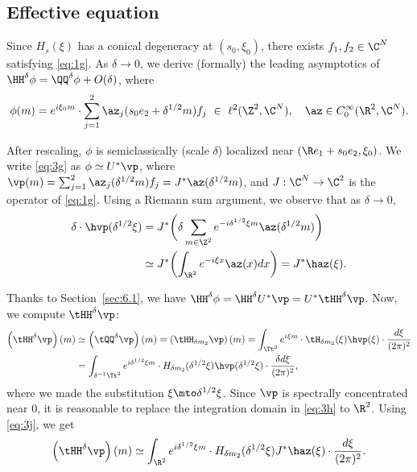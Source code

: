 \subsection{Effective equation} Since $H_s(\xi)$ has a conical degeneracy at $(s_0,\xi_0)$, there exists $f_1, f_2 \in \C^N$ satisfying \eqref{eq:1g}. As $\delta \to 0$, we derive (formally) the leading asymptotics of $\HH^\delta \phi = \QQ^\delta \phi + O(\delta)$, where
\begin{equation}\label{eq:3g}
\phi(m) = e^{i\xi_0 m} \cdot \sum_{j=1}^2 \az_j(s_0 e_2+\delta^{1/2} m) f_j \ \in \ \ell^2(\Z^2,\C^N), \quad \az \in C_0^\infty(\R^2,\C^N).
\end{equation}

After rescaling, $\phi$ is semiclassically (scale $\delta$) localized near $(\R e_1 + s_0e_2,\xi_0)$.
We write \eqref{eq:3g} as $\phi \simeq U^* \vp$, where $\vp(m) = \sum_{j=1}^2 \az_j(\delta^{1/2} m) f_j = J^* \az(\delta^{1/2} m)$,
and $J : \C^N \to \C^2$ is the operator of \eqref{eq:1g}. Using a Riemann sum argument, we observe that as $\delta \to 0$,
\begin{equation}\label{eq:3j}
\begin{split}
\delta \cdot \hvp(\delta^{1/2} \xi) &= J^* \biggl( \delta \sum_{m \in \Z^2} e^{-i \delta^{1/2} \xi m} \az(\delta^{1/2} m) \biggr)\\
&\simeq J^* \biggl( \int_{\R^2} e^{-i \xi x} \az(x) dx\biggr) = J^* \haz(\xi).
\end{split}
\end{equation}

Thanks to Section~\ref{sec:6.1}, we have $\HH^\delta \phi = \HH^\delta U^* \vp = U^* \tHH^\delta \vp$. Now, we compute $\tHH^\delta \vp$:
\begin{equation}\label{eq:3h}
\begin{split}
\left(\tHH^\delta \vp \right)(m) &\simeq \left(\tQQ^\delta \vp\right)(m) = \left(\tHH_{\delta m_2} \vp\right)(m) = \int_{\Tt^2} e^{i\xi m} \cdot \tH_{\delta m_2}(\xi) \hvp(\xi) \cdot \dfrac{d\xi}{(2\pi)^2}
\\
&= \int_{\delta^{-1} \Tt^2} e^{i\delta^{1/2} \xi m} \cdot H_{\delta m_2}(\delta^{1/2} \xi) \hvp(\delta^{1/2} \xi) \cdot \dfrac{\delta d\xi}{(2\pi)^2},
\end{split}
\end{equation}
where we made the substitution $\xi \mto \delta^{1/2} \xi$. Since $\vp$ is spectrally concentrated near $0$, it is reasonable to replace the integration domain in \eqref{eq:3h} to $\R^2$. Using \eqref{eq:3j}, we get
\begin{equation}\label{eq:3m}
\left(\tHH^\delta \vp \right)(m) \simeq \int_{\R^2} e^{i\delta^{1/2} \xi m} \cdot H_{\delta m_2}(\delta^{1/2} \xi) J^* \haz(\xi) \cdot \dfrac{d\xi}{(2\pi )^2}.
\end{equation}


